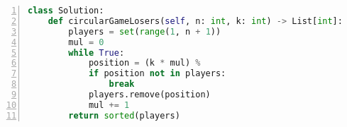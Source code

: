 \begin{figure*}
\centering
\begin{lstlisting}[breaklines=true, language=Python, frame=shadowbox, numbers=left,]
class Solution:
    def circularGameLosers(self, n: int, k: int) -> List[int]:
        players = set(range(1, n + 1))
        mul = 0
        while True:
            position = (k * mul) %
            if position not in players:
                break
            players.remove(position)
            mul += 1
        return sorted(players)
\end{lstlisting}
\label{lst:python-acc-wrong-gen}
\end{figure*}
